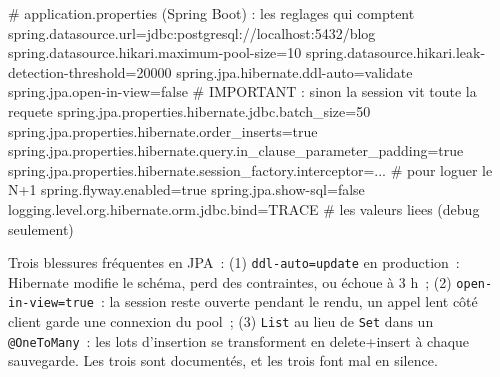 
\begin{codeconf}
# application.properties (Spring Boot) : les reglages qui comptent
spring.datasource.url=jdbc:postgresql://localhost:5432/blog
spring.datasource.hikari.maximum-pool-size=10
spring.datasource.hikari.leak-detection-threshold=20000
spring.jpa.hibernate.ddl-auto=validate
spring.jpa.open-in-view=false                       # IMPORTANT : sinon la session vit toute la requete
spring.jpa.properties.hibernate.jdbc.batch_size=50
spring.jpa.properties.hibernate.order_inserts=true
spring.jpa.properties.hibernate.query.in_clause_parameter_padding=true
spring.jpa.properties.hibernate.session_factory.interceptor=...   # pour loguer le N+1
spring.flyway.enabled=true
spring.jpa.show-sql=false
logging.level.org.hibernate.orm.jdbc.bind=TRACE      # les valeurs liees (debug seulement)
\end{codeconf}

\begin{piege}
Trois blessures fr\'equentes en JPA~: (1) \verb|ddl-auto=update| en production~: Hibernate modifie le
sch\'ema, perd des contraintes, ou \'echoue \`a 3 h~; (2) \verb|open-in-view=true|~: la session reste
ouverte pendant le rendu, un appel lent c\^ot\'e client garde une connexion du pool~; (3) \verb|List| au
lieu de \verb|Set| dans un \verb|@OneToMany|~: les lots d'insertion se transforment en delete+insert
\`a chaque sauvegarde. Les trois sont document\'es, et les trois font mal en silence.
\end{piege}


